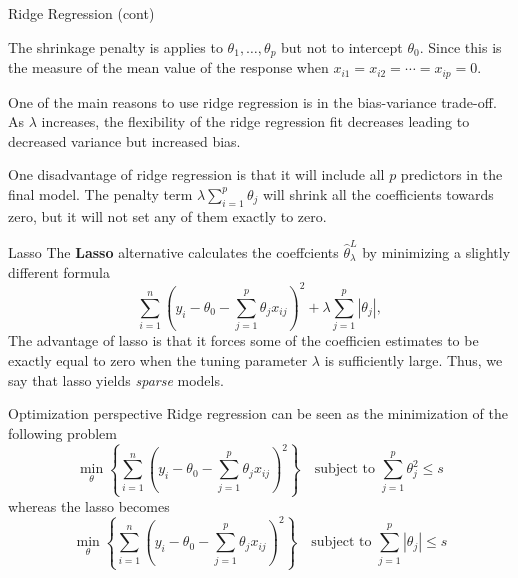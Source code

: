\documentclass{beamer}
\begin{document}
\begin{frame}{Ridge Regression (cont)}
	
	The shrinkage penalty is applies to $\theta_1,\ldots, \theta_p$ but not to intercept $\theta_0$.  Since this is the measure of the mean value of the response when $x_{i1}=x_{i2}=\cdots=x_{ip}=0$.
	
	One of the main reasons to use ridge regression is in the bias-variance trade-off. As $\lambda $ increases, the flexibility of the ridge regression fit decreases leading to decreased variance but increased bias. 
	
	One disadvantage of ridge regression is that it will include all $p$ predictors in the final model. The penalty term $\lambda \sum_{i=1}^p \theta_j$ will shrink all the coefficients towards zero, but it will not set any of them exactly to zero. 
\end{frame}

\begin{frame}{Lasso}
	The {\bf Lasso} alternative calculates the coeffcients $\hat{\theta}_\lambda^L$ by minimizing a slightly different formula
\begin{equation*}
	\sum_{i=1}^n \left( y_i - \theta_0 - \sum_{j=1}^p \theta_j x_{ij} \right)^2 + \lambda \sum_{j=1}^p |\theta_j|,
\end{equation*} 	
	The advantage of lasso is that it forces some of the coefficien estimates to be exactly equal to zero when the tuning parameter $\lambda$ is sufficiently large. Thus, we say that lasso yields {\it sparse} models.
\end{frame}

\begin{frame}{Optimization perspective}
	Ridge regression can be seen as the minimization of the following problem
	\begin{equation*}
		\min_{\theta} \left\{ \sum_{i=1}^n \left( y_i - \theta_0 - \sum_{j=1}^p \theta_j x_{ij} \right)^2 \right\} \quad\textrm{subject to }   \sum_{j=1}^p \theta_j^2 \le s
	\end{equation*} 
whereas the lasso becomes 
\begin{equation*}
	\min_{\theta} \left\{ \sum_{i=1}^n \left( y_i - \theta_0 - \sum_{j=1}^p \theta_j x_{ij} \right)^2 \right\} \quad\textrm{subject to }   \sum_{j=1}^p |\theta_j | \le s
\end{equation*} 

\end{frame}
\end{document}
